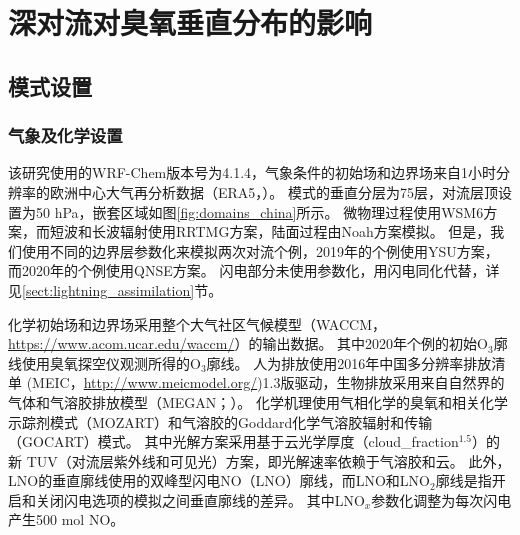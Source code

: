 
\chapter{深对流对臭氧垂直分布的影响}

\section{模式设置}

\subsection{气象及化学设置}

该研究使用的WRF-Chem版本号为4.1.4，气象条件的初始场和边界场来自1小时分辨率的欧洲中心大气再分析数据（ERA5，\citet{Hersbach.2020}）。
模式的垂直分层为75层，对流层顶设置为50 hPa，嵌套区域如图\ref{fig:domains_china}所示。
微物理过程使用WSM6方案\citep{Hong.2006a}，而短波和长波辐射使用RRTMG方案\citep{Iacono.2008}，陆面过程由Noah方案模拟\citep{Koren.1999}。
但是，我们使用不同的边界层参数化来模拟两次对流个例，2019年的个例使用YSU方案\citep{Hong.2006}，而2020年的个例使用QNSE方案\citep{Sukoriansky.2005}。
闪电部分未使用参数化，用闪电同化代替，详见\ref{sect:lightning_assimilation}节。

化学初始场和边界场采用整个大气社区气候模型（WACCM，\url{https://www.acom.ucar.edu/waccm/}）的输出数据。
其中2020年个例的初始O$_3$廓线使用臭氧探空仪观测所得的O$_3$廓线。
人为排放使用2016年中国多分辨率排放清单 (MEIC，\url{http://www.meicmodel.org/})1.3版驱动，生物排放采用来自自然界的气体和气溶胶排放模型（MEGAN；\citet{Guenther.2006}）。
化学机理使用气相化学的臭氧和相关化学示踪剂模式（MOZART）和气溶胶的Goddard化学气溶胶辐射和传输（GOCART）模式\citep{Pfister.2011}。
其中光解方案采用基于云光学厚度（cloud\_fraction$^{1.5}$）的新 TUV（对流层紫外线和可见光）方案，即光解速率依赖于气溶胶和云。
此外，LNO的垂直廓线使用\citet{Ott.2010}的双峰型闪电NO（LNO）廓线\citep{Laughner.2017}，而LNO和LNO$_2$廓线是指开启和关闭闪电选项的模拟之间垂直廓线的差异。
其中LNO$_x$参数化调整为每次闪电产生500 mol NO\citep{Zhu.2019}。

